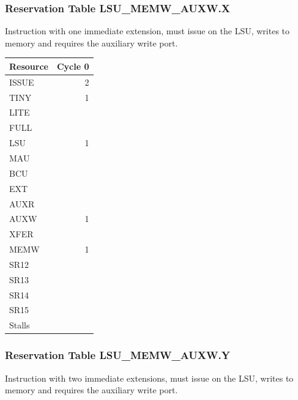 \subsubsection{Reservation Table LSU\_MEMW\_AUXW.X} \label{sec:reservation-LSU-MEMW-AUXW.X}

Instruction with one immediate extension, must issue on the LSU, writes to memory and requires the auxiliary write port.
\medskip

\begin{tabular}{|l|r|} \hline
Resource	& Cycle 0 \\ \hline
\textsf{ISSUE}	& 2	\\
\textsf{TINY}	& 1	\\
\textsf{LITE}	& 	\\
\textsf{FULL}	& 	\\
\textsf{LSU}	& 1	\\
\textsf{MAU}	& 	\\
\textsf{BCU}	& 	\\
\textsf{EXT}	& 	\\
\textsf{AUXR}	& 	\\
\textsf{AUXW}	& 1	\\
\textsf{XFER}	& 	\\
\textsf{MEMW}	& 1	\\
\textsf{SR12}	& 	\\
\textsf{SR13}	& 	\\
\textsf{SR14}	& 	\\
\textsf{SR15}	& 	\\
\hline Stalls	& 	\\
\hline \end{tabular}

\subsubsection{Reservation Table LSU\_MEMW\_AUXW.Y} \label{sec:reservation-LSU-MEMW-AUXW.Y}

Instruction with two immediate extensions, must issue on the LSU, writes to memory and requires the auxiliary write port.
\medskip

